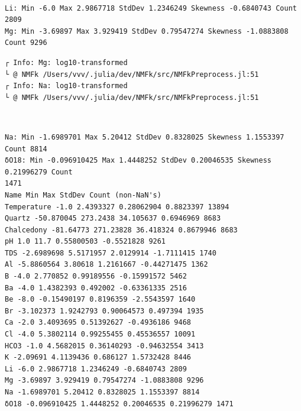 \documentclass[11pt]{article}
\begin{document}
    \begin{center}
    \end{center}
    { \hspace*{\fill} \\}
    
    \begin{Verbatim}[commandchars=\\\{\}]
Li: Min -6.0 Max 2.9867718 StdDev 1.2346249 Skewness -0.6840743 Count 2809
Mg: Min -3.69897 Max 3.929419 StdDev 0.79547274 Skewness -1.0883808 Count 9296
    \end{Verbatim}

    \begin{Verbatim}[commandchars=\\\{\}]
┌ Info: Mg: log10-transformed
└ @ NMFk /Users/vvv/.julia/dev/NMFk/src/NMFkPreprocess.jl:51
┌ Info: Na: log10-transformed
└ @ NMFk /Users/vvv/.julia/dev/NMFk/src/NMFkPreprocess.jl:51
    \end{Verbatim}

    \begin{center}
    \end{center}
    { \hspace*{\fill} \\}
    
    \begin{Verbatim}[commandchars=\\\{\}]
Na: Min -1.6989701 Max 5.20412 StdDev 0.8328025 Skewness 1.1553397 Count 8814
δO18: Min -0.096910425 Max 1.4448252 StdDev 0.20046535 Skewness 0.21996279 Count
1471
Name Min Max StdDev Count (non-NaN's)
Temperature -1.0 2.4393327 0.28062904 0.8823397 13894
Quartz -50.870045 273.2438 34.105637 0.6946969 8683
Chalcedony -81.64773 271.23828 36.418324 0.8679946 8683
pH 1.0 11.7 0.55800503 -0.5521828 9261
TDS -2.6989698 5.5171957 2.0129914 -1.7111415 1740
Al -5.8860564 3.80618 1.2161667 -0.44271475 1362
B -4.0 2.770852 0.99189556 -0.15991572 5462
Ba -4.0 1.4382393 0.492002 -0.63361335 2516
Be -8.0 -0.15490197 0.8196359 -2.5543597 1640
Br -3.102373 1.9242793 0.90064573 0.497394 1935
Ca -2.0 3.4093695 0.51392627 -0.4936186 9468
Cl -4.0 5.3802114 0.99255455 0.45536557 10091
HCO3 -1.0 4.5682015 0.36140293 -0.94632554 3413
K -2.09691 4.1139436 0.686127 1.5732428 8446
Li -6.0 2.9867718 1.2346249 -0.6840743 2809
Mg -3.69897 3.929419 0.79547274 -1.0883808 9296
Na -1.6989701 5.20412 0.8328025 1.1553397 8814
δO18 -0.096910425 1.4448252 0.20046535 0.21996279 1471
    \end{Verbatim}
\end{document}
